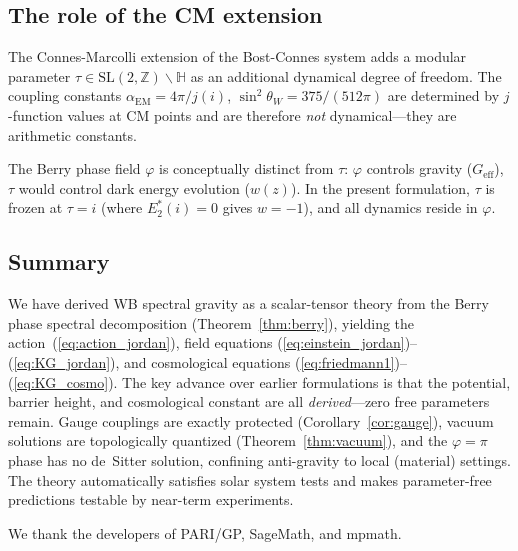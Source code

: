 \documentclass[aps,prd,twocolumn,superscriptaddress,nofootinbib]{revtex4-2}
\newcommand{\Geff}{G_{\mathrm{eff}}}
\begin{document}
\subsection{The role of the CM extension}

The Connes-Marcolli extension of the Bost-Connes system
adds a modular parameter $\tau \in \mathrm{SL}(2,\mathbb{Z})\backslash\mathbb{H}$
as an additional dynamical degree of freedom.
The coupling constants $\alpha_{\mathrm{EM}} = 4\pi/j(i)$,
$\sin^2\theta_W = 375/(512\pi)$ are determined by
$j$-function values at CM points and are therefore
\emph{not} dynamical---they are arithmetic constants.

The Berry phase field $\varphi$ is conceptually distinct
from $\tau$:
$\varphi$ controls gravity ($\Geff$),
$\tau$ would control dark energy evolution ($w(z)$).
In the present formulation, $\tau$ is frozen at $\tau = i$
(where $E_2^*(i) = 0$ gives $w = -1$),
and all dynamics reside in $\varphi$.

\subsection{Summary}

We have derived WB spectral gravity as a scalar-tensor theory
from the Berry phase spectral decomposition
(Theorem~\ref{thm:berry}), yielding
the action~(\ref{eq:action_jordan}),
field equations (\ref{eq:einstein_jordan})--(\ref{eq:KG_jordan}),
and cosmological equations (\ref{eq:friedmann1})--(\ref{eq:KG_cosmo}).
The key advance over earlier formulations is that the
potential, barrier height, and cosmological constant are all
\emph{derived}---zero free parameters remain.
Gauge couplings are exactly protected
(Corollary~\ref{cor:gauge}),
vacuum solutions are topologically quantized
(Theorem~\ref{thm:vacuum}),
and the $\varphi = \pi$ phase has no de~Sitter solution,
confining anti-gravity to local (material) settings.
The theory automatically satisfies solar system tests
and makes parameter-free predictions testable
by near-term experiments.

\begin{acknowledgments}
We thank the developers of PARI/GP, SageMath, and mpmath.
\end{acknowledgments}
\end{document}
